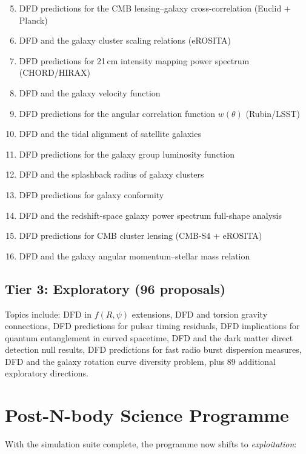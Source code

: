 \documentclass[11pt,a4paper]{article}
\begin{document}
\begin{enumerate}[nosep]
\setcounter{enumi}{4}
\item DFD predictions for the CMB lensing--galaxy cross-correlation (Euclid + Planck)
\item DFD and the galaxy cluster scaling relations (eROSITA)
\item DFD predictions for 21\,cm intensity mapping power spectrum (CHORD/HIRAX)
\item DFD and the galaxy velocity function
\item DFD predictions for the angular correlation function $w(\theta)$ (Rubin/LSST)
\item DFD and the tidal alignment of satellite galaxies
\item DFD predictions for the galaxy group luminosity function
\item DFD and the splashback radius of galaxy clusters
\item DFD predictions for galaxy conformity
\item DFD and the redshift-space galaxy power spectrum full-shape analysis
\item DFD predictions for CMB cluster lensing (CMB-S4 + eROSITA)
\item DFD and the galaxy angular momentum--stellar mass relation
\end{enumerate}

\subsection{Tier 3: Exploratory (96 proposals)}

Topics include: DFD in $f(R,\psi)$ extensions, DFD and torsion gravity connections, DFD predictions for pulsar timing residuals, DFD implications for quantum entanglement in curved spacetime, DFD and the dark matter direct detection null results, DFD predictions for fast radio burst dispersion measures, DFD and the galaxy rotation curve diversity problem, plus 89 additional exploratory directions.

\section{Post-N-body Science Programme}

With the simulation suite complete, the programme now shifts to \emph{exploitation}:
\end{document}

